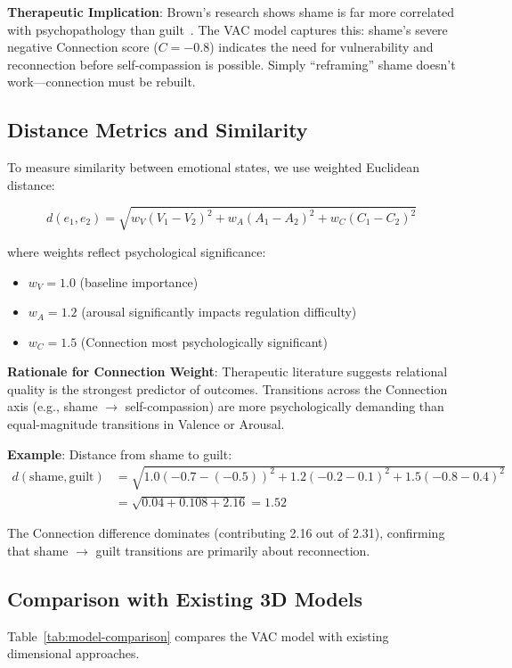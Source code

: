 \textbf{Therapeutic Implication}: Brown's research shows shame is far more correlated with psychopathology than guilt~\cite{brown2006}. The VAC model captures this: shame's severe negative Connection score ($C = -0.8$) indicates the need for vulnerability and reconnection before self-compassion is possible. Simply ``reframing'' shame doesn't work—connection must be rebuilt.

\subsection{Distance Metrics and Similarity}

To measure similarity between emotional states, we use weighted Euclidean distance:

$$d(e_1, e_2) = \sqrt{w_V(V_1 - V_2)^2 + w_A(A_1 - A_2)^2 + w_C(C_1 - C_2)^2}$$

where weights reflect psychological significance:
\begin{itemize}
    \item $w_V = 1.0$ (baseline importance)
    \item $w_A = 1.2$ (arousal significantly impacts regulation difficulty)
    \item $w_C = 1.5$ (Connection most psychologically significant)
\end{itemize}

\textbf{Rationale for Connection Weight}: Therapeutic literature suggests relational quality is the strongest predictor of outcomes. Transitions across the Connection axis (e.g., shame $\rightarrow$ self-compassion) are more psychologically demanding than equal-magnitude transitions in Valence or Arousal.

\textbf{Example}: Distance from shame to guilt:
\begin{align}
d(\text{shame}, \text{guilt}) &= \sqrt{1.0(-0.7 - (-0.5))^2 + 1.2(-0.2 - 0.1)^2 + 1.5(-0.8 - 0.4)^2} \nonumber\\
&= \sqrt{0.04 + 0.108 + 2.16} = 1.52
\end{align}

The Connection difference dominates (contributing 2.16 out of 2.31), confirming that shame $\rightarrow$ guilt transitions are primarily about reconnection.

\subsection{Comparison with Existing 3D Models}

Table~\ref{tab:model-comparison} compares the VAC model with existing dimensional approaches.

